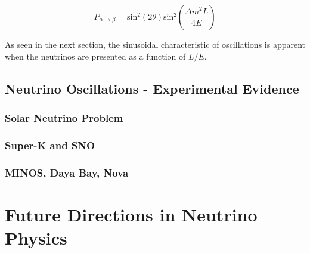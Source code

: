 \begin{equation}
P_{\alpha\rightarrow\beta} = \text{sin}^2(2\theta)\text{sin}^2\left( \frac{\Delta m^2 L}{4 E} \right)
\end{equation}

As seen in the next section, the sinusoidal characteristic of oscillations is apparent when the neutrinos are presented as a function of $L/E$.

\subsection{Neutrino Oscillations - Experimental Evidence}

\subsubsection{Solar Neutrino Problem}

\subsubsection{Super-K and SNO}

\subsubsection{MINOS, Daya Bay, Nova}



\section{Future Directions in Neutrino Physics}
\label{sec:future_experiments}

